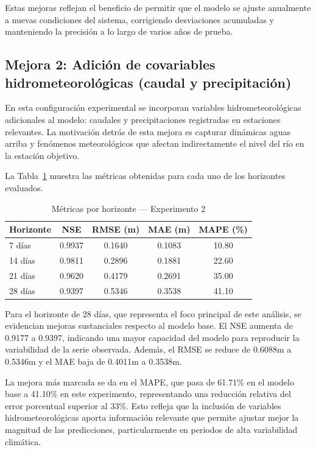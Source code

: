 Estas mejoras reflejan el beneficio de permitir que el modelo se ajuste anualmente a nuevas condiciones del sistema, corrigiendo desviaciones acumuladas y manteniendo la precisión a lo largo de varios años de prueba.


\subsection{Mejora 2: Adición de covariables hidrometeorológicas (caudal y precipitación)}
\label{ssec:exp2}

En esta configuración experimental se incorporan variables hidrometeorológicas adicionales al modelo: caudales y precipitaciones registradas en estaciones relevantes. La motivación detrás de esta mejora es capturar dinámicas aguas arriba y fenómenos meteorológicos que afectan indirectamente el nivel del río en la estación objetivo.

La Tabla~\ref{tab:exp2_metricas_horizontes} muestra las métricas obtenidas para cada uno de los horizontes evaluados.

\begin{table}[H]
\centering
\caption{Métricas por horizonte — Experimento 2}
\label{tab:exp2_metricas_horizontes}
\begin{tabular}{lcccc}
\toprule
\textbf{Horizonte} & \textbf{NSE} & \textbf{RMSE (m)} & \textbf{MAE (m)} & \textbf{MAPE (\%)} \\
\midrule
7 días  & 0.9937 & 0.1640 & 0.1083 & 10.80 \\
14 días & 0.9811 & 0.2896 & 0.1881 & 22.60 \\
21 días & 0.9620 & 0.4179 & 0.2691 & 35.00 \\
28 días & 0.9397 & 0.5346 & 0.3538 & 41.10 \\
\bottomrule
\end{tabular}
\end{table}

Para el horizonte de 28 días, que representa el foco principal de este análisis, se evidencian mejoras sustanciales respecto al modelo base. El NSE aumenta de 0.9177 a 0.9397, indicando una mayor capacidad del modelo para reproducir la variabilidad de la serie observada. Además, el RMSE se reduce de 0.6088m a 0.5346m y el MAE baja de 0.4011m a 0.3538m.

La mejora más marcada se da en el MAPE, que pasa de 61.71\% en el modelo base a 41.10\% en este experimento, representando una reducción relativa del error porcentual superior al 33\%. Esto refleja que la inclusión de variables hidrometeorológicas aporta información relevante que permite ajustar mejor la magnitud de las predicciones, particularmente en periodos de alta variabilidad climática.

